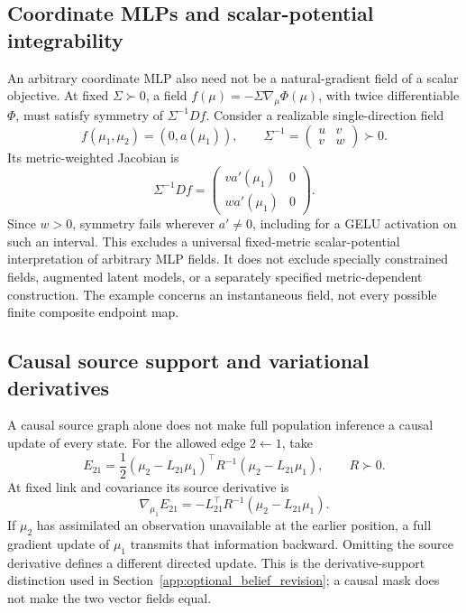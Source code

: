 \documentclass[twoside,11pt]{article}
\begin{document}
\subsection{Coordinate MLPs and scalar-potential integrability}
\label{sec:mlp_gradient_scope}

An arbitrary coordinate MLP also need not be a natural-gradient field of a scalar objective. At fixed \(\Sigma\succ0\), a field \(f(\mu)=-\Sigma\nabla_\mu\Phi(\mu)\), with twice differentiable \(\Phi\), must satisfy symmetry of \(\Sigma^{-1}Df\). Consider a realizable single-direction field
\begin{equation}
f(\mu_1,\mu_2)=(0,a(\mu_1)),\qquad
\Sigma^{-1}=
\begin{pmatrix}u&v\\v&w\end{pmatrix}\succ0.
\label{eq:mlp_integrability_example}
\end{equation}
Its metric-weighted Jacobian is
\begin{equation}
\Sigma^{-1}Df=
\begin{pmatrix}
v a'(\mu_1)&0\\
w a'(\mu_1)&0
\end{pmatrix}.
\label{eq:mlp_integrability_jacobian}
\end{equation}
Since \(w>0\), symmetry fails wherever \(a'\ne0\), including for a GELU activation on such an interval. This excludes a universal fixed-metric scalar-potential interpretation of arbitrary MLP fields. It does not exclude specially constrained fields, augmented latent models, or a separately specified metric-dependent construction. The example concerns an instantaneous field, not every possible finite composite endpoint map.

\subsection{Causal source support and variational derivatives}
\label{sec:causal_gradient_scope}

A causal source graph alone does not make full population inference a causal update of every state. For the allowed edge \(2\leftarrow1\), take
\begin{equation}
E_{21}=\frac12(\mu_2-L_{21}\mu_1)^\top
R^{-1}(\mu_2-L_{21}\mu_1),\qquad R\succ0.
\end{equation}
At fixed link and covariance its source derivative is
\begin{equation}
\nabla_{\mu_1}E_{21}
=-L_{21}^{\top}R^{-1}(\mu_2-L_{21}\mu_1).
\label{eq:causal_source_derivative}
\end{equation}
If \(\mu_2\) has assimilated an observation unavailable at the earlier position, a full gradient update of \(\mu_1\) transmits that information backward. Omitting the source derivative defines a different directed update. This is the derivative-support distinction used in Section~\ref{app:optional_belief_revision}; a causal mask does not make the two vector fields equal.
\end{document}
